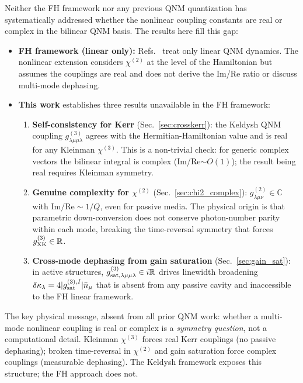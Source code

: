 \documentclass[12pt]{article}
\begin{document}
Neither the FH framework nor any previous QNM quantization has
systematically addressed whether the nonlinear coupling constants are
real or complex in the bilinear QNM basis.  The results here fill
this gap:
\begin{itemize}
  \item \textbf{FH framework (linear only):} Refs.~\cite{Franke2019,Ren2021}
    treat only linear QNM dynamics.  The nonlinear extension
    \cite{Franke2020} considers $\chi^{(2)}$ at the level of the
    Hamiltonian but assumes the couplings are real and does
    not derive the Im/Re ratio or discuss multi-mode dephasing.

  \item \textbf{This work} establishes three results unavailable in
    the FH framework:
    \begin{enumerate}
      \item \textbf{Self-consistency for Kerr}
        (Sec.~\ref{sec:crosskerr}): the Keldysh QNM coupling
        $g^{(3)}_{\lambda\mu\mu\lambda}$ agrees with the
        Hermitian-Hamiltonian value and is real for any Kleinman
        $\chi^{(3)}$.  This is a non-trivial check: for generic
        complex vectors the bilinear integral is complex
        (Im/Re$\sim O(1)$); the result being real requires
        Kleinman symmetry.

      \item \textbf{Genuine complexity for $\chi^{(2)}$}
        (Sec.~\ref{sec:chi2_complex}):
        $g^{(2)}_{\lambda\mu\nu}\in\mathbb{C}$ with
        $\mathrm{Im}/\mathrm{Re}\sim 1/Q$, even for passive media.
        The physical origin is that parametric down-conversion
        does not conserve photon-number parity within each mode,
        breaking the time-reversal symmetry that forces
        $g^{(3)}_{\rm XK}\in\mathbb{R}$.

      \item \textbf{Cross-mode dephasing from gain saturation}
        (Sec.~\ref{sec:gain_sat}): in active structures,
        $g^{(3)}_{\rm sat,\lambda\mu\mu\lambda}\in i\mathbb{R}$
        drives linewidth broadening
        $\delta\kappa_\lambda = 4|g^{(3),I}_{\rm sat}|\bar{n}_\mu$
        that is absent from any passive cavity and inaccessible
        to the FH linear framework.
    \end{enumerate}
\end{itemize}
The key physical message, absent from all prior QNM work: whether a
multi-mode nonlinear coupling is real or complex is a \emph{symmetry
question}, not a computational detail.  Kleinman $\chi^{(3)}$ forces
real Kerr couplings (no passive dephasing); broken time-reversal in
$\chi^{(2)}$ and gain saturation force complex couplings (measurable
dephasing).  The Keldysh framework exposes this structure; the FH
approach does not.
\end{document}
